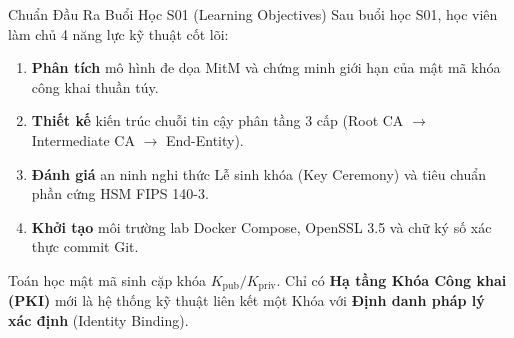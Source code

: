 \begin{frame}{Chuẩn Đầu Ra Buổi Học S01 (Learning Objectives)}
  \small
  Sau buổi học S01, học viên làm chủ 4 năng lực kỹ thuật cốt lõi:
  \begin{enumerate}
    \item \textbf{Phân tích} mô hình đe dọa MitM và chứng minh giới hạn của mật mã khóa công khai thuần túy.
    \item \textbf{Thiết kế} kiến trúc chuỗi tin cậy phân tầng 3 cấp (Root CA $\to$ Intermediate CA $\to$ End-Entity).
    \item \textbf{Đánh giá} an ninh nghi thức Lễ sinh khóa (Key Ceremony) và tiêu chuẩn phần cứng HSM FIPS 140-3.
    \item \textbf{Khởi tạo} môi trường lab Docker Compose, OpenSSL 3.5 và chữ ký số xác thực commit Git.
  \end{enumerate}

  \begin{keybox}
    Toán học mật mã sinh cặp khóa $K_{\text{pub}} / K_{\text{priv}}$. Chỉ có \textbf{Hạ tầng Khóa Công khai (PKI)} mới là hệ thống kỹ thuật liên kết một Khóa với \textbf{Định danh pháp lý xác định} (Identity Binding).
  \end{keybox}
\end{frame}

